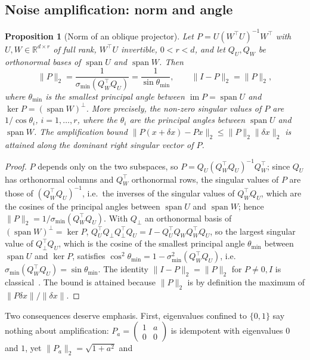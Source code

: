 \documentclass[11pt,a4paper]{article}
\theoremstyle{plain}
\newtheorem{proposition}{Proposition}
\theoremstyle{definition}
\theoremstyle{remark}
\newcommand{\R}{\mathbb R}
\newcommand{\im}{\operatorname{im}}
\newcommand{\spn}{\operatorname{span}}
\newcommand{\T}{\top}
\begin{document}
\subsection{Noise amplification: norm and angle}
\begin{proposition}[Norm of an oblique projector]
\label{prop:norm-angle}
Let $P=U(W^\T U)^{-1}W^\T$ with $U,W\in\R^{d\times r}$ of full rank, $W^\T U$
invertible, $0<r<d$, and let $Q_U,Q_W$ be orthonormal bases of $\spn U$ and
$\spn W$. Then
\begin{equation}
  \|P\|_2=\frac1{\sigma_{\min}(Q_W^\T Q_U)}=\frac1{\sin\theta_{\min}},\qquad
  \|I-P\|_2=\|P\|_2,
  \label{eq:norm-angle}
\end{equation}
where $\theta_{\min}$ is the smallest principal angle between $\im P=\spn U$
and $\ker P=(\spn W)^\perp$. More precisely, the non-zero singular values of
$P$ are $1/\cos\theta_i$, $i=1,\dots,r$, where the $\theta_i$ are the
principal angles between $\spn U$ and $\spn W$. The amplification bound
$\|P(x+\delta x)-Px\|_2\le\|P\|_2\|\delta x\|_2$ is attained along the
dominant right singular vector of $P$.
\end{proposition}
\begin{proof}
$P$ depends only on the two subspaces, so $P=Q_U(Q_W^\T Q_U)^{-1}Q_W^\T$;
since $Q_U$ has orthonormal columns and $Q_W^\T$ orthonormal rows, the
singular values of $P$ are those of $(Q_W^\T Q_U)^{-1}$, i.e.\ the inverses
of the singular values of $Q_W^\T Q_U$, which are the cosines of the
principal angles between $\spn U$ and $\spn W$; hence
$\|P\|_2=1/\sigma_{\min}(Q_W^\T Q_U)$. With $Q_\perp$ an orthonormal basis of
$(\spn W)^\perp=\ker P$,
$Q_U^\T Q_\perp Q_\perp^\T Q_U=I-Q_U^\T Q_WQ_W^\T Q_U$, so the largest
singular value of $Q_\perp^\T Q_U$, which is the cosine of the smallest
principal angle $\theta_{\min}$ between $\spn U$ and $\ker P$, satisfies
$\cos^2\theta_{\min}=1-\sigma_{\min}^2(Q_W^\T Q_U)$, i.e.\
$\sigma_{\min}(Q_W^\T Q_U)=\sin\theta_{\min}$. The identity
$\|I-P\|_2=\|P\|_2$ for $P\ne0,I$ is classical~\cite{szyld2006,ipsenmeyer1995}.
The bound is attained because $\|P\|_2$ is by definition the maximum of
$\|P\delta x\|/\|\delta x\|$.
\end{proof}
Two consequences deserve emphasis. First, eigenvalues confined to $\{0,1\}$
say nothing about amplification: $P_a=\begin{pmatrix}1&a\\0&0\end{pmatrix}$
is idempotent with eigenvalues $0$ and $1$, yet $\|P_a\|_2=\sqrt{1+a^2}$ and
\end{document}
